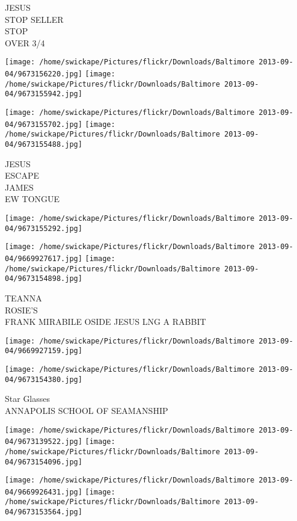 \documentclass[10pt,letterpaper]{article}
\begin{document}
JESUS\\
STOP SELLER\\
STOP\\
OVER 3/4
\pagebreak

\texttt{[image: /home/swickape/Pictures/flickr/Downloads/Baltimore 2013-09-04/9673156220.jpg]}
\texttt{[image: /home/swickape/Pictures/flickr/Downloads/Baltimore 2013-09-04/9673155942.jpg]}

\texttt{[image: /home/swickape/Pictures/flickr/Downloads/Baltimore 2013-09-04/9673155702.jpg]}
\texttt{[image: /home/swickape/Pictures/flickr/Downloads/Baltimore 2013-09-04/9673155488.jpg]}

JESUS\\
ESCAPE\\
JAMES\\
EW TONGUE
\pagebreak

\texttt{[image: /home/swickape/Pictures/flickr/Downloads/Baltimore 2013-09-04/9673155292.jpg]}

\vspace{0.25in}
\texttt{[image: /home/swickape/Pictures/flickr/Downloads/Baltimore 2013-09-04/9669927617.jpg]}
\texttt{[image: /home/swickape/Pictures/flickr/Downloads/Baltimore 2013-09-04/9673154898.jpg]}

TEANNA\\
ROSIE'S\\
FRANK MIRABILE OSIDE JESUS LNG A RABBIT
\pagebreak

\texttt{[image: /home/swickape/Pictures/flickr/Downloads/Baltimore 2013-09-04/9669927159.jpg]}

\vspace{0.25in}
\texttt{[image: /home/swickape/Pictures/flickr/Downloads/Baltimore 2013-09-04/9673154380.jpg]}

Star Glasses\\
ANNAPOLIS SCHOOL OF SEAMANSHIP
\pagebreak

\texttt{[image: /home/swickape/Pictures/flickr/Downloads/Baltimore 2013-09-04/9673139522.jpg]}
\texttt{[image: /home/swickape/Pictures/flickr/Downloads/Baltimore 2013-09-04/9673154096.jpg]}

\texttt{[image: /home/swickape/Pictures/flickr/Downloads/Baltimore 2013-09-04/9669926431.jpg]}
\texttt{[image: /home/swickape/Pictures/flickr/Downloads/Baltimore 2013-09-04/9673153564.jpg]}
\end{document}
